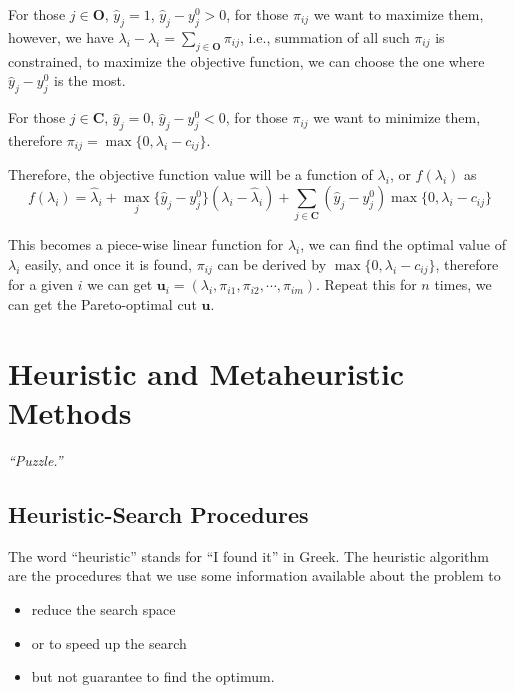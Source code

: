                 For those $j \in \mathbf{O}$, $\hat{y}_j = 1$, $\hat{y}_j - y_j^0 > 0$, for those $\pi_{ij}$ we want to maximize them, however, we have $\lambda_i - \hat{\lambda}_i = \sum_{j \in \mathbf{O}} \pi_{ij}$, i.e., summation of all such $\pi_{ij}$ is constrained, to maximize the objective function, we can choose the one where $\hat{y}_j - y_j^0$ is the most.

                For those $j \in \mathbf{C}$, $\hat{y}_j = 0$, $\hat{y}_j - y_j^0 < 0$, for those $\pi_{ij}$ we want to minimize them, therefore $\pi_{ij} = \max \{0, \lambda_i - c_{ij}\}$.

                Therefore, the objective function value will be a function of $\lambda_i$, or $f(\lambda_i)$ as 
                \begin{equation}
                    f(\lambda_i) = \hat{\lambda}_i + \max_j \{\hat{y}_j - y_j^0\} (\lambda_i - \hat{\lambda}_i) + \sum_{j \in \mathbf{C}} (\hat{y}_j - y_j^0)\max\{0, \lambda_i - c_{ij}\}
                \end{equation}

                This becomes a piece-wise linear function for $\lambda_i$, we can find the optimal value of $\lambda_i$ easily, and once it is found, $\pi_{ij}$ can be derived by $\max\{0, \lambda_i - c_{ij}\}$, therefore for a given $i$ we can get $\mathbf{u}_{i} = (\lambda_i, \pi_{i1}, \pi_{i2}, \cdots, \pi_{im})$. Repeat this for $n$ times, we can get the Pareto-optimal cut $\mathbf{u}$.

    \chapter{Heuristic and Metaheuristic Methods}
        \begin{center}
            \textit{``Puzzle.''}
        \end{center}

        \section{Heuristic-Search Procedures}

            The word ``heuristic'' stands for ``I found it'' in Greek. The heuristic algorithm are the procedures that we use some information available about the problem to
            \begin{itemize}
                \item reduce the search space
                \item or to speed up the search
                \item but not guarantee to find the optimum.
            \end{itemize}

